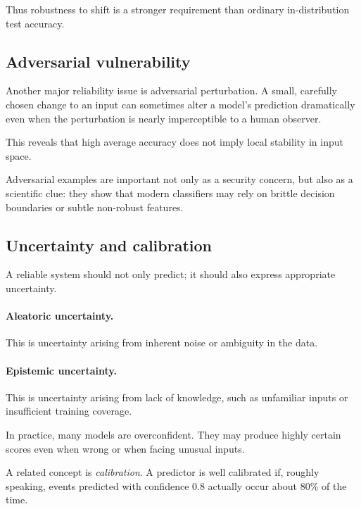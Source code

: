Thus robustness to shift is a stronger requirement than ordinary in-distribution test accuracy.

\subsection*{Adversarial vulnerability}

Another major reliability issue is adversarial perturbation.
A small, carefully chosen change to an input can sometimes alter a model's prediction dramatically even when the perturbation is nearly imperceptible to a human observer.

\medskip

This reveals that high average accuracy does not imply local stability in input space.

\medskip

Adversarial examples are important not only as a security concern, but also as a scientific clue:
they show that modern classifiers may rely on brittle decision boundaries or subtle non-robust features.

\subsection*{Uncertainty and calibration}

A reliable system should not only predict; it should also express appropriate uncertainty.

\paragraph{Aleatoric uncertainty.}
This is uncertainty arising from inherent noise or ambiguity in the data.

\paragraph{Epistemic uncertainty.}
This is uncertainty arising from lack of knowledge, such as unfamiliar inputs or insufficient training coverage.

\medskip

In practice, many models are overconfident.
They may produce highly certain scores even when wrong or when facing unusual inputs.

\medskip

A related concept is \emph{calibration}.
A predictor is well calibrated if, roughly speaking, events predicted with confidence \(0.8\) actually occur about \(80\%\) of the time.

